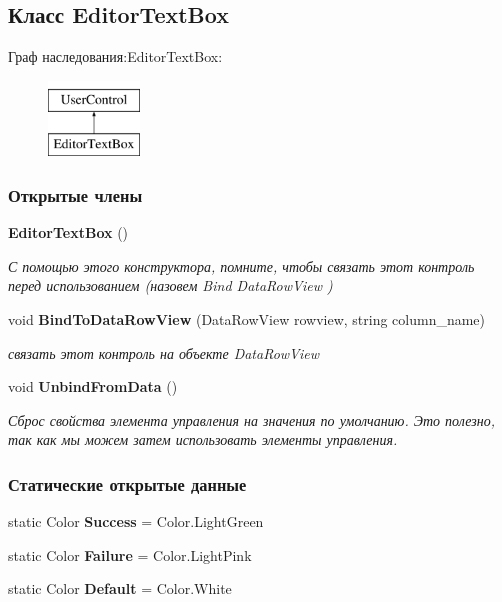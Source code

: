 \subsection{Класс Editor\+Text\+Box}
\label{classkdz__manager_1_1_editor_text_box}
Граф наследования\+:Editor\+Text\+Box\+:\begin{figure}[H]
\begin{center}
\leavevmode
\includegraphics[height=2.000000cm]{classkdz__manager_1_1_editor_text_box}
\end{center}
\end{figure}
\subsubsection*{Открытые члены}
\begin{DoxyCompactItemize}
\item 
{\bf Editor\+Text\+Box} ()
\begin{DoxyCompactList}\small\item\em С помощью этого конструктора, помните, чтобы связать этот контроль перед использованием (назовем Bind Data\+Row\+View ) \end{DoxyCompactList}\item 
void {\bf Bind\+To\+Data\+Row\+View} (Data\+Row\+View rowview, string column\+\_\+name)
\begin{DoxyCompactList}\small\item\em связать этот контроль на объекте Data\+Row\+View \end{DoxyCompactList}\item 
void {\bf Unbind\+From\+Data} ()
\begin{DoxyCompactList}\small\item\em Сброс свойства элемента управления на значения по умолчанию. Это полезно, так как мы можем затем использовать элементы управления. \end{DoxyCompactList}\end{DoxyCompactItemize}
\subsubsection*{Статические открытые данные}
\begin{DoxyCompactItemize}
\item 
static Color {\bfseries Success} = Color.\+Light\+Green\label{classkdz__manager_1_1_editor_text_box_a412e64ff5e03578f96baf3d42ca7cc47}

\item 
static Color {\bfseries Failure} = Color.\+Light\+Pink\label{classkdz__manager_1_1_editor_text_box_a66daee56c8498eb96286ff892b941f20}

\item 
static Color {\bfseries Default} = Color.\+White\label{classkdz__manager_1_1_editor_text_box_ae9f7469c1ac140130f288a9a2a417409}

\end{DoxyCompactItemize}
